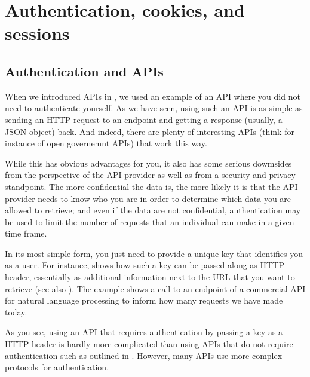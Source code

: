 \section{Authentication, cookies, and sessions}
\label{sec:authentication}

\subsection{Authentication and APIs}
\label{sec:authapi}
When we introduced APIs in , we used an example of an
API where you did not need to authenticate yourself. As we have seen,
using such an API is as simple as sending an HTTP request to an
endpoint and getting a response (usually, a JSON object) back. And
indeed, there are plenty of interesting APIs (think for instance of
open governemnt APIs) that work this way.

While this has obvious advantages for you, it also has some serious
dowmsides from the perspective of the API provider as well as from
a security and privacy standpoint. The more confidential the data is,
the more likely it is that the API provider needs to know who you
are in order to determine which data you are allowed to retrieve;
and even if the data are not confidential, authentication may be
used to limit the number of requests that an individual can make
in a given time frame.

In its most simple form, you just need to provide a unique key that
identifies you as a user. For instance,  shows how
such a key can be passed along as HTTP header, essentially as
additional information next to the URL that you want to retrieve (see
also ). The example shows a call to an endpoint
of a commercial API for natural language processing to inform how
many requests we have made today.


As you see, using an API that requires authentication by passing a key
as a HTTP header is hardly more complicated than using APIs that do
not require authentication such as outlined in .
However, many APIs use more complex protocols for authentication.

